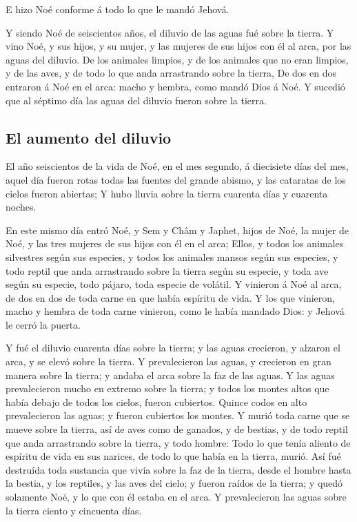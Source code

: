  E hizo Noé conforme á todo lo que le mandó Jehová.

 Y siendo Noé de seiscientos años, el diluvio de las aguas
fué sobre la tierra.  Y vino Noé, y sus hijos, y su mujer, y
las mujeres de sus hijos con él al arca, por las aguas del diluvio.
 De los animales limpios, y de los animales que no eran
limpios, y de las aves, y de todo lo que anda arrastrando sobre la
tierra,  De dos en dos entraron á Noé en el arca: macho y
hembra, como mandó Dios á Noé.  Y sucedió que al séptimo
día las aguas del diluvio fueron sobre la tierra.

\hypertarget{el-aumento-del-diluvio}{%
\subsection{El aumento del diluvio}\label{el-aumento-del-diluvio}}

 El año seiscientos de la vida de Noé, en el mes segundo, á
diecisiete días del mes, aquel día fueron rotas todas las fuentes del
grande abismo, y las cataratas de los cielos fueron abiertas;
 Y hubo lluvia sobre la tierra cuarenta días y cuarenta
noches.

 En este mismo día entró Noé, y Sem y Châm y Japhet, hijos
de Noé, la mujer de Noé, y las tres mujeres de sus hijos con él en el
arca;  Ellos, y todos los animales silvestres según sus
especies, y todos los animales mansos según sus especies, y todo reptil
que anda arrastrando sobre la tierra según su especie, y toda ave según
su especie, todo pájaro, toda especie de volátil.  Y
vinieron á Noé al arca, de dos en dos de toda carne en que había
espíritu de vida.  Y los que vinieron, macho y hembra de
toda carne vinieron, como le había mandado Dios: y Jehová le cerró la
puerta.

 Y fué el diluvio cuarenta días sobre la tierra; y las
aguas crecieron, y alzaron el arca, y se elevó sobre la tierra.
 Y prevalecieron las aguas, y crecieron en gran manera
sobre la tierra; y andaba el arca sobre la faz de las aguas.
 Y las aguas prevalecieron mucho en extremo sobre la
tierra; y todos los montes altos que había debajo de todos los cielos,
fueron cubiertos.  Quince codos en alto prevalecieron las
aguas; y fueron cubiertos los montes.  Y murió toda carne
que se mueve sobre la tierra, así de aves como de ganados, y de bestias,
y de todo reptil que anda arrastrando sobre la tierra, y todo hombre:
 Todo lo que tenía aliento de espíritu de vida en sus
narices, de todo lo que había en la tierra, murió.  Así fué
destruída toda sustancia que vivía sobre la faz de la tierra, desde el
hombre hasta la bestia, y los reptiles, y las aves del cielo; y fueron
raídos de la tierra; y quedó solamente Noé, y lo que con él estaba en el
arca.  Y prevalecieron las aguas sobre la tierra ciento y
cincuenta días.

